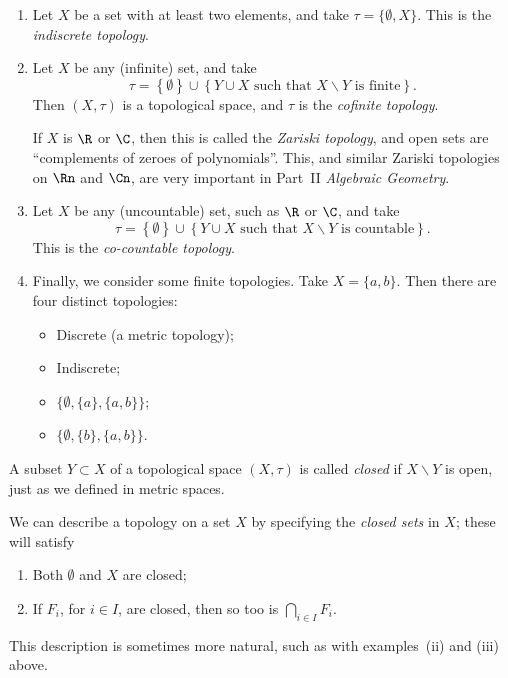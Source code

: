 \begin{examples}
	 \label{eg:non-metric-topologies} \mbox{}
	\begin{enumerate}
		\shortskip
		\item Let $X$ be a set with at least two elements, and take $\tau=\{\emptyset, X\}$. This is the \emph{indiscrete topology}.
		\item Let $X$ be any (infinite) set, and take
		\begin{equation*}
			\tau = \left\{\emptyset\right\} \cup \left\{Y \cup \text{$X$ such that $X\backslash Y$ is finite}\right\}.
		\end{equation*}
		Then $(X,\tau)$ is a topological space, and $\tau$ is the \emph{cofinite topology}.

		If $X$ is $\R$ or $\C$, then this is called the \emph{Zariski topology}, and open sets are ``complements of zeroes of polynomials''. This, and similar Zariski topologies on $\Rn$ and $\Cn$, are very important in Part~II \emph{Algebraic Geometry}.
		\item Let $X$ be any (uncountable) set, such as $\R$ or $\C$, and take
		\begin{equation*}
			\tau = \left\{\emptyset\right\} \cup \left\{Y \cup \text{$X$ such that $X\backslash Y$ is countable}\right\}.
		\end{equation*}
		This is the \emph{co-countable topology}.
		\item Finally, we consider some finite topologies. Take $X=\{a,b\}$. Then there are four distinct topologies:
		\begin{itemize}
			\shortskip
			\item Discrete (a metric topology);
			\item Indiscrete;
			\item $\{\emptyset, \{a\}, \{a,b\}\}$;
			\item $\{\emptyset, \{b\}, \{a,b\}\}$.
		\end{itemize}
	\end{enumerate}
\end{examples}

	\pagebreak

\begin{remark}
	A subset $Y\subset X$ of a topological space $(X,\tau)$ is called \emph{closed} if $X\backslash Y$ is open, just as we defined in metric spaces.

	We can describe a topology on a set $X$ by specifying the \emph{closed sets} in $X$; these will satisfy
	\begin{enumerate}
		\shortskip
		\item Both $\emptyset$ and $X$ are closed;
		\item If $F_i$, for $i\in I$, are closed, then so too is $\bigcap_{i\in I} F_i$.
	\end{enumerate}
	This description is sometimes more natural, such as with examples~(ii) and (iii) above.
\end{remark}

